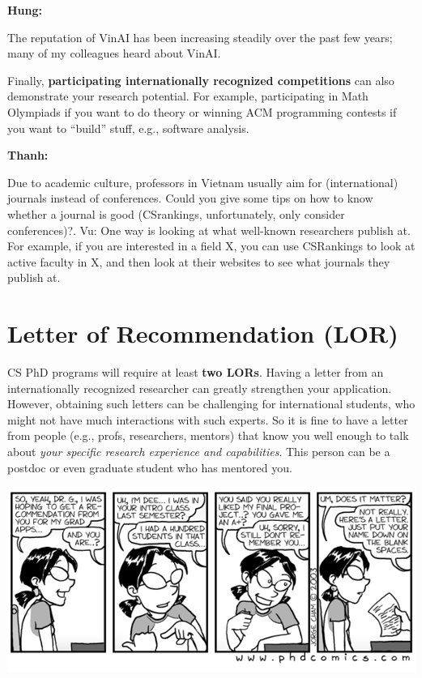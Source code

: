 \documentclass[oneside,11pt]{memoir}
\newenvironment{commentbox}[1][]{
\small
    \begin{mybox}
    {\small \textbf{#1}}
 }{
   \end{mybox}
}
\begin{document}
\begin{commentbox}[Hung:]
The reputation of VinAI has been increasing steadily over the past few years; many of my colleagues heard about VinAI.
\end{commentbox}

Finally, \textbf{participating internationally recognized competitions} can also demonstrate your research potential.
For example, participating in Math Olympiads if you want to do theory or  winning ACM programming contests if you want to ``build'' stuff, e.g., software analysis.

\begin{commentbox}[Thanh:]
Due to academic culture, professors in Vietnam usually aim for (international) journals instead of conferences. Could you give some tips on how to know whether a journal is good (CSrankings, unfortunately, only consider conferences)?.
\tcblower
Vu: One way is looking at what well-known researchers publish at. For example, if you are interested in a field X, you can use CSRankings to look at active faculty in X, and then look at their websites to see what journals they publish at.
\end{commentbox}

\section{Letter of Recommendation (LOR)}\label{sec:lor}

CS PhD programs will require at least \textbf{two LORs}. Having a letter from an internationally recognized researcher can greatly strengthen your application. However, obtaining such letters
can be challenging for international students, who might not have much interactions with such experts. So it is fine to have a letter from people (e.g., profs, researchers, mentors) that know you well enough to talk about \emph{your specific research experience and capabilities}. This person can be a postdoc or even graduate student who has mentored you.  

\begin{center}
\includegraphics[width=0.6\linewidth]{c6.png}
\end{center}
\end{document}
